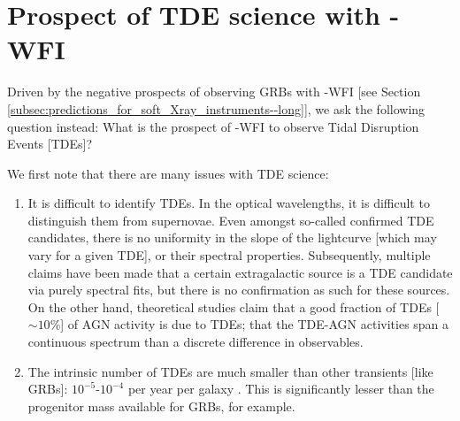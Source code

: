 \section{Prospect of TDE science with \A-WFI}
\label{sec:prospects}
Driven by the negative prospects of observing GRBs with \A -WFI [see Section \ref{subsec:predictions_for_soft_Xray_instruments--long}], we ask the following question instead: What is the prospect of \A -WFI to observe Tidal Disruption Events [TDEs]?

We first note that there are many issues with TDE science:
\begin{enumerate}
\item It is difficult to identify TDEs. In the optical wavelengths, it is difficult to distinguish them from supernovae. Even amongst so-called confirmed TDE candidates, there is no uniformity in the slope of the lightcurve [which may vary for a given TDE], or their spectral properties. Subsequently, multiple claims have been made that a certain extragalactic source is a TDE candidate via purely spectral fits, but there is no confirmation as such for these sources. On the other hand, theoretical studies claim that a good fraction of TDEs [$\sim 10 \%$] of AGN activity is due to TDEs; that the TDE-AGN activities span a continuous spectrum than a discrete difference in observables.

\item The intrinsic number of TDEs are much smaller than other transients [like GRBs]: $10^{-5}$-$10^{-4}$ per year per galaxy \citep{Auchettl_et_al.-2018-ApJ}. This is significantly lesser than the progenitor mass available for GRBs, for example.
\end{enumerate}

